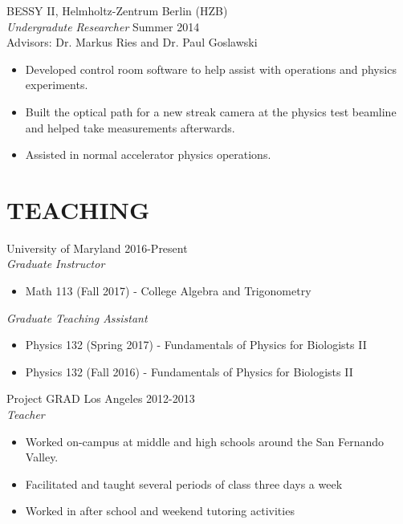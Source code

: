 \documentclass[line,margin]{res}
\begin{document}
\begin{resume}
                BESSY II,  Helmholtz-Zentrum Berlin (HZB) \\
                {\sl Undergradute Researcher} \hfill Summer 2014\\
                Advisors: Dr. Markus Ries and Dr. Paul Goslawski
                  \begin{itemize} \itemsep -2pt %
                   \item Developed control room software to help assist with operations and physics experiments.
                   \item Built the optical path for a new streak camera at the physics test beamline and helped take measurements afterwards.
                   \item Assisted in normal accelerator physics operations.
                   \end{itemize} 
 
\section{TEACHING}  University of Maryland \hfill 2016-Present \\
                    {\sl Graduate Instructor} \\
                    \begin{itemize} \itemsep -2pt
                    \item Math 113 (Fall 2017) - College Algebra and Trigonometry
                    \end{itemize}                    
                    {\sl Graduate Teaching Assistant} \\
                    \begin{itemize} \itemsep -2pt
                    \item Physics 132 (Spring 2017) - Fundamentals of Physics for Biologists II
                    \item Physics 132 (Fall 2016) - Fundamentals of Physics for Biologists II
                    \end{itemize}
                    Project GRAD Los Angeles \hfill 2012-2013 \\
                    {\sl Teacher}
                    \begin{itemize} \itemsep -2pt
                    \item Worked on-campus at middle and high schools around the San Fernando Valley.
                    \item Facilitated and taught several periods of class three days a week
                    \item Worked in after school and weekend tutoring activities
                    \end{itemize}
                    


\end{resume}
\end{document}
